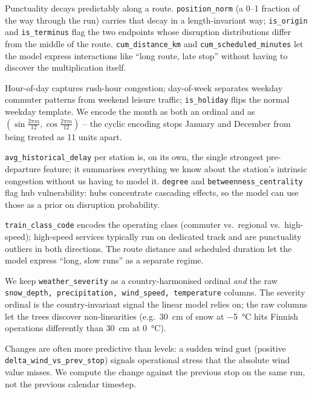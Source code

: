 \begin{description}[leftmargin=2.0em, style=nextline, itemsep=2pt]
    \item[Stop position (7 cols).] Punctuality decays predictably along a route. \texttt{position\_norm} (a 0--1 fraction of the way through the run) carries that decay in a length-invariant way; \texttt{is\_origin} and \texttt{is\_terminus} flag the two endpoints whose disruption distributions differ from the middle of the route. \texttt{cum\_distance\_km} and \texttt{cum\_scheduled\_minutes} let the model express interactions like ``long route, late stop'' without having to discover the multiplication itself.
    \item[Stop time (6 cols).] Hour-of-day captures rush-hour congestion; day-of-week separates weekday commuter patterns from weekend leisure traffic; \texttt{is\_holiday} flips the normal weekday template. We encode the month as both an ordinal and as $(\sin\frac{2\pi m}{12}, \cos\frac{2\pi m}{12})$ -- the cyclic encoding stops January and December from being treated as 11 units apart.
    \item[Station static (5 cols).] \texttt{avg\_historical\_delay} per station is, on its own, the single strongest pre-departure feature; it summarises everything we know about the station's intrinsic congestion without us having to model it. \texttt{degree} and \texttt{betweenness\_centrality} flag hub vulnerability: hubs concentrate cascading effects, so the model can use those as a prior on disruption probability.
    \item[Service identity (4 cols).] \texttt{train\_class\_code} encodes the operating class (commuter vs.\ regional vs.\ high-speed); high-speed services typically run on dedicated track and are punctuality outliers in both directions. The route distance and scheduled duration let the model express ``long, slow runs'' as a separate regime.
    \item[Weather (5 cols).] We keep \texttt{weather\_severity} as a country-harmonised ordinal \emph{and} the raw \texttt{snow\_depth, precipitation, wind\_speed, temperature} columns. The severity ordinal is the country-invariant signal the linear model relies on; the raw columns let the trees discover non-linearities (e.g.\ \SI{30}{cm} of snow at \SI{-5}{\celsius} hits Finnish operations differently than \SI{30}{cm} at \SI{0}{\celsius}).
    \item[Weather differential (2 cols).] Changes are often more predictive than levels: a sudden wind gust (positive \texttt{delta\_wind\_vs\_prev\_stop}) signals operational stress that the absolute wind value misses. We compute the change against the previous stop on the same run, not the previous calendar timestep.

\end{description}
